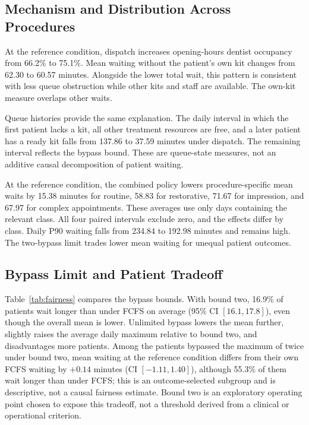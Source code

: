 \documentclass[conference]{IEEEtran}
\begin{document}
\subsection{Mechanism and Distribution Across Procedures}
At the reference condition, dispatch increases opening-hours dentist occupancy from 66.2\% to 75.1\%. Mean waiting without the patient's own kit changes from 62.30 to 60.57 minutes. Alongside the lower total wait, this pattern is consistent with less queue obstruction while other kits and staff are available. The own-kit measure overlaps other waits.

Queue histories provide the same explanation. The daily interval in which the first patient lacks a kit, all other treatment resources are free, and a later patient has a ready kit falls from 137.86 to 37.59 minutes under dispatch. The remaining interval reflects the bypass bound. These are queue-state measures, not an additive causal decomposition of patient waiting.

At the reference condition, the combined policy lowers procedure-specific mean waits by 15.38 minutes for routine, 58.83 for restorative, 71.67 for impression, and 67.97 for complex appointments. These averages use only days containing the relevant class. All four paired intervals exclude zero, and the effects differ by class. Daily P90 waiting falls from 234.84 to 192.98 minutes and remains high. The two-bypass limit trades lower mean waiting for unequal patient outcomes.

\subsection{Bypass Limit and Patient Tradeoff}\label{subsec:bypass}
Table~\ref{tab:fairness} compares the bypass bounds. With bound two, 16.9\% of patients wait longer than under FCFS on average (95\% CI $[16.1,17.8]$), even though the overall mean is lower. Unlimited bypass lowers the mean further, slightly raises the average daily maximum relative to bound two, and disadvantages more patients. Among the patients bypassed the maximum of twice under bound two, mean waiting at the reference condition differs from their own FCFS waiting by $+0.14$ minutes (CI $[-1.11,1.40]$), although 55.3\% of them wait longer than under FCFS; this is an outcome-selected subgroup and is descriptive, not a causal fairness estimate. Bound two is an exploratory operating point chosen to expose this tradeoff, not a threshold derived from a clinical or operational criterion.
\end{document}
